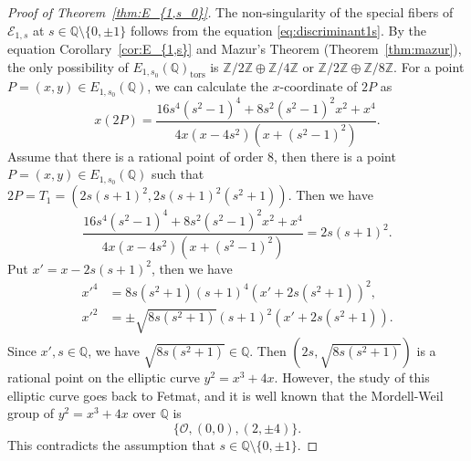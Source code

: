\documentclass[main]{subfiles}
\begin{document}
\begin{proof}[Proof of Theorem~{\ref{thm:E_{1,s_0}}}]
    The non-singularity of the special fibers of $\mathcal{E}_{1,s}$ at $s \in \mathbb{Q} \setminus \{0,\pm 1 \}$ follows from the equation \eqref{eq:discriminant1s}.
    By the equation Corollary~\ref{cor:E_{1,s}} and Mazur's Theorem (Theorem~\ref{thm:mazur}), the only possibility of $E_{1,s_0}(\mathbb{Q})_{\text{tors}}$ is $\mathbb{Z} / 2 \mathbb{Z} \oplus \mathbb{Z} / 4 \mathbb{Z}$ or $\mathbb{Z} / 2 \mathbb{Z} \oplus \mathbb{Z} / 8 \mathbb{Z}$.
    For a point $P=(x,y) \in E_{1,s_0}(\mathbb{Q})$, we can calculate the $x$-coordinate of $2P$ as
    \begin{equation*}
        x(2P) = \frac{16s^{4}(s^{2} - 1)^{4} + 8 s^{2}(s^{2} - 1)^{2} x^{2} + x^{4}}{4 x (x - 4s^{2}) (x + (s^{2} - 1)^{2})}.
    \end{equation*}
    Assume that there is a rational point of order $8$, then there is a point $P=(x,y) \in E_{1,s_0}(\mathbb{Q})$ such that $2P = T_1 = (2s(s+1)^2, 2s(s+1)^2(s^2+1))$.
    Then we have
    \begin{equation*}
        \frac{16s^{4}(s^{2} - 1)^{4} + 8 s^{2}(s^{2} - 1)^{2} x^{2} + x^{4}}{4 x (x - 4s^{2}) (x + (s^{2} - 1)^{2})} = 2s(s + 1)^{2}.
    \end{equation*}
    Put $x' = x - 2s(s+1)^2$, then we have
    \begin{align*}
        x'^4 & = 8s(s^{2} + 1)(s + 1)^{4}(x' + 2s(s^2+1))^{2},        \\
        x'^2 & = \pm \sqrt{8 s (s^2 + 1)} (s+1)^{2} (x' + 2s(s^2+1)).
    \end{align*}
    Since $x', s \in \mathbb{Q}$, we have $\sqrt{8 s (s^2 + 1)} \in \mathbb{Q}$.
    Then $(2s, \sqrt{8 s (s^2 + 1)})$ is a rational point on the elliptic curve $y^2 = x^3 + 4x$.
    However, the study of this elliptic curve goes back to Fetmat, and it is well known that the Mordell-Weil group of $y^2 = x^3 + 4x$ over $\mathbb{Q}$ is
    \begin{equation*}
        \{\mathcal{O}, (0,0), (2,\pm 4) \}.
    \end{equation*}
    This contradicts the assumption that $s \in \mathbb{Q} \setminus \{0,\pm 1 \}$.
\end{proof}
\end{document}
